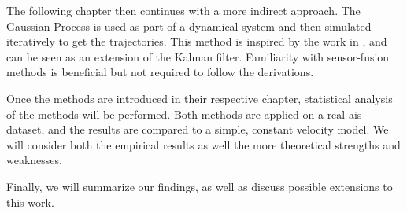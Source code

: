 The following chapter then continues with a more indirect approach. The Gaussian Process is used as part of a dynamical system and then simulated iteratively to get the trajectories. This method is inspired by the work in \cite{pedestrian,gpekf}, and can be seen as an extension of the Kalman filter. Familiarity with sensor-fusion methods is beneficial but not required to follow the derivations.

Once the methods are introduced in their respective chapter, statistical analysis of the methods will be performed. Both methods are applied on a real \acrshort{ais} dataset, and the results are compared to a simple, constant velocity model.  We will consider both the empirical results as well the more theoretical strengths and weaknesses. 

Finally, we will summarize our findings, as well as discuss possible extensions to this work.



